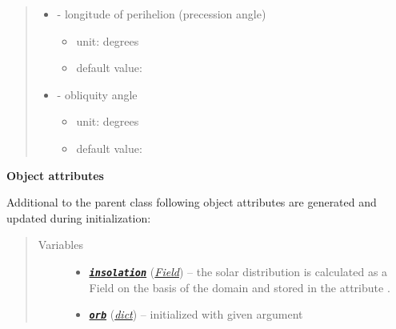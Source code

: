 \documentclass[letterpaper,10pt,english]{sphinxmanual}
\begin{document}
\begin{fulllineitems}
\begin{quote}
\begin{description}
\begin{itemize}
\begin{itemize}
\begin{itemize}
\end{itemize}

\item {} 
 - longitude of perihelion (precession angle)
\begin{itemize}
\item {} 
unit: degrees

\item {} 
default value: 

\end{itemize}

\item {} 
 - obliquity angle
\begin{itemize}
\item {} 
unit: degrees

\item {} 
default value: 

\end{itemize}

\end{itemize}


\end{itemize}

\end{description}\end{quote}

\textbf{Object attributes}

Additional to the parent class {\hyperref[api/climlab.radiation:climlab.radiation.insolation._Insolation]{\emph{}}}
following object attributes are generated and updated during initialization:
\begin{quote}\begin{description}
\item[{Variables}] \leavevmode\begin{itemize}
\item {} 
{\hyperref[api/climlab.radiation:module-climlab.radiation.insolation]{\emph{\textbf{\texttt{insolation}}}}} ({\hyperref[api/climlab.domain:climlab.domain.field.Field]{\emph{\emph{Field}}}}) -- the solar distribution is calculated as a Field on 
the basis of the  domain
and stored in the attribute .

\item {} 
{\hyperref[api/climlab.radiation:climlab.radiation.insolation.AnnualMeanInsolation.orb]{\emph{\textbf{\texttt{orb}}}}} (\href{http://docs.python.org/2.7/library/stdtypes.html\#dict}{\emph{dict}}) -- initialized with given argument 

\end{itemize}

\end{description}\end{quote}

\end{fulllineitems}
\end{document}
